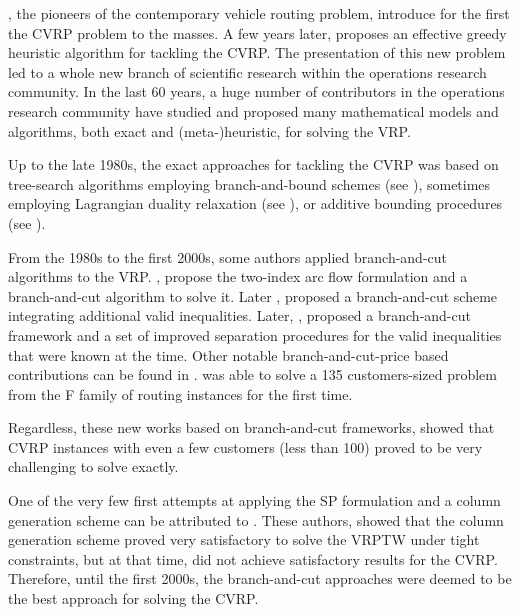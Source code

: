 \textcite{dantzig1959},
the pioneers of the contemporary vehicle routing problem,
introduce for the first the CVRP problem to the masses.
A few years later, \textcite{clarke1964} proposes
an effective greedy heuristic algorithm for tackling the CVRP.
The presentation of this new problem led to a whole new branch
of scientific research within the operations research community.
In the last 60 years, a huge number of contributors in
the operations research community have studied and proposed many
mathematical models and algorithms, both exact and (meta-)heuristic,
for solving the VRP.

Up to the late 1980s, the exact approaches for tackling the CVRP was
based on tree-search algorithms employing branch-and-bound schemes
(see \textcite{pierce1969, christofides1969a, christofides1981, laporte1986}),
sometimes employing Lagrangian duality relaxation (see \textcite{fisher1994a, miller1995}),
or additive bounding procedures (see \textcite{fischetti1994a, hadjiconstantinou1995}).

From the 1980s to the first 2000s, some authors applied branch-and-cut
algorithms to the VRP.
\textcite{laporte1983, laporte1985}, propose the two-index arc flow formulation
and a branch-and-cut algorithm to solve it.
Later \textcite{augerat1995a}, proposed a branch-and-cut scheme
integrating additional valid inequalities.
Later, \textcite{lysgaard2004},
proposed a branch-and-cut framework and
a set of improved separation procedures for
the valid inequalities that were known at the time.
Other notable branch-and-cut-price based contributions
can be found in \textcite{araqueg1994, augerat1995, achuthan1996, blasum2000, ralphs2003, achuthan2003, baldacci2004}.
\citeauthor{baldacci2004} was able to solve a
135 customers-sized problem from the F family of routing instances \textcite{fisher1994}
for the first time.

Regardless, these new works based on branch-and-cut frameworks, showed that CVRP instances
with even a few customers (less than 100) proved
to be very challenging to solve exactly.


One of the very few first attempts at applying
the SP formulation and a column generation scheme can
be attributed to \textcite{desrosiers1984, agarwal1989}.
These authors, showed that the column generation scheme proved
very satisfactory to solve the VRPTW under tight constraints,
but at that time, did not achieve satisfactory results for the CVRP.
Therefore, until the first 2000s, the branch-and-cut approaches
were deemed to be the best approach for solving the CVRP.

